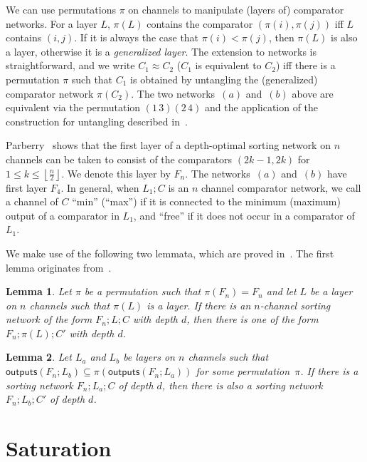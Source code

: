 \documentclass[10pt]{IEEEtran}
\newcommand{\outputs}{\mathsf{outputs}}
\newtheorem{lemma}{Lemma}
\begin{document}
We can use permutations $\pi$ on channels to manipulate (layers of)
comparator networks.  For a layer $L$, $\pi(L)$ contains the comparator $(\pi(i),\pi(j))$
iff $L$ contains $(i,j)$. If it is always the case that $\pi(i) <
\pi(j)$, then $\pi(L)$ is also a layer, otherwise it is a
\emph{generalized layer}. The extension to networks is
straightforward, and we write $C_1 \approx C_2$ ($C_1$ is equivalent
to $C_2$) iff there is a permutation $\pi$ such that $C_1$ is obtained
by untangling the (generalized) comparator network $\pi(C_2)$.  The
two networks~$(a)$ and~$(b)$ above are equivalent via the permutation
$(1\,3)(2\,4)$ and the application of the construction for untangling
described in~\cite{Knuth73}.

Parberry~\cite{DBLP:journals/mst/Parberry91} shows that the first
layer of a depth-optimal sorting network on $n$ channels can be
taken to consist of the comparators $(2k-1,2k)$ for $1 \leq k \leq
\left\lfloor \frac{n}{2} \right\rfloor$. We denote this layer by $F_n$.  The
networks~$(a)$ and~$(b)$ have first layer $F_4$.
In general, when $L_1;C$ is an $n$ channel
comparator network, we call a channel of $C$ ``min'' (``max'') if it
is connected to the minimum (maximum) output of a comparator in $L_1$,
and ``free'' if it does not occur in a comparator of~$L_1$.

We make use of the following two lemmata, which are proved
in~\cite{DBLP:conf/lata/BundalaZ14}.
The first lemma originates from~\cite{DBLP:journals/mst/Parberry91}.

\begin{lemma}Let $\pi$ be a permutation
  such that $\pi(F_n) = F_n$ and let $L$ be a layer on $n$ channels
  such that $\pi(L)$ is a layer. If there is an $n$-channel
  sorting network of the form $F_n;L;C$ with depth $d$, then there is one of the form
  $F_n;\pi(L);C'$ with depth $d$.
\end{lemma}


\begin{lemma}
  \label{lem:outputs}
  Let $L_a$ and $L_b$ be layers on $n$ channels such that
  $\outputs(F_n;L_b) \subseteq \pi(\outputs(F_n;L_a))$ for
  some permutation~$\pi$. If there is a sorting network $F_n;L_a;C$ of
  depth $d$, then there is also a sorting network $F_n;L_b;C'$ of
  depth $d$.
\end{lemma}



\section{Saturation}
\end{document}
